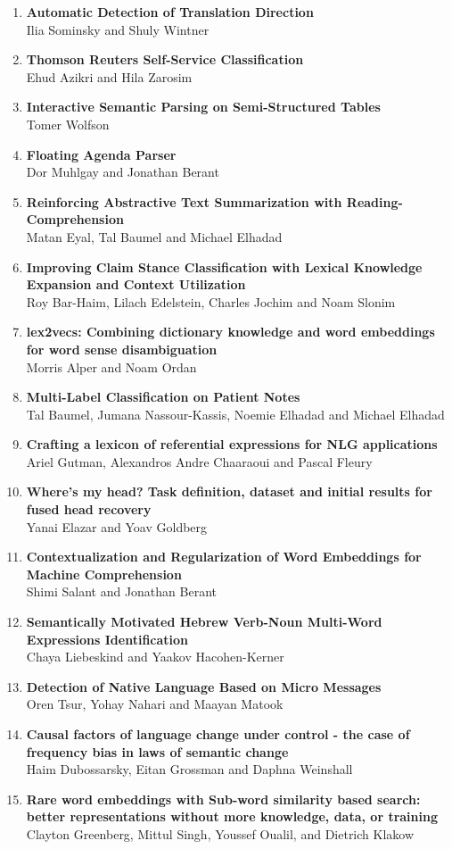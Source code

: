 \documentclass[a0,portrait]{a0poster}
\begin{document}
\begin{enumerate}
\item
  \textbf{Automatic Detection of Translation Direction}\\
  Ilia Sominsky and Shuly Wintner
\item
  \textbf{Thomson Reuters Self-Service Classification}\\
  Ehud Azikri and Hila Zarosim
\item
  \textbf{Interactive Semantic Parsing on Semi-Structured Tables}\\
  Tomer Wolfson
\item
  \textbf{Floating Agenda Parser}\\
  Dor Muhlgay and Jonathan Berant
\item
  \textbf{Reinforcing Abstractive Text Summarization with
  Reading-Comprehension}\\
  Matan Eyal, Tal Baumel and Michael Elhadad
\item
  \textbf{Improving Claim Stance Classification with Lexical Knowledge
  Expansion and Context Utilization}\\
  Roy Bar-Haim, Lilach Edelstein, Charles Jochim and Noam Slonim
\item
  \textbf{lex2vecs: Combining dictionary knowledge and word embeddings
  for word sense disambiguation}\\
  Morris Alper and Noam Ordan
\item
  \textbf{Multi-Label Classification on Patient Notes}\\
  Tal Baumel, Jumana Nassour-Kassis, Noemie Elhadad and Michael Elhadad
\item
  \textbf{Crafting a lexicon of referential expressions for NLG
  applications}\\
  Ariel Gutman, Alexandros Andre Chaaraoui and Pascal Fleury
\item
  \textbf{Where's my head? Task definition, dataset and initial results
  for fused head recovery}\\
  Yanai Elazar and Yoav Goldberg
\item
  \textbf{Contextualization and Regularization of Word Embeddings for
  Machine Comprehension}\\
  Shimi Salant and Jonathan Berant
\item
  \textbf{Semantically Motivated Hebrew Verb-Noun Multi-Word Expressions
  Identification}\\
  Chaya Liebeskind and Yaakov Hacohen-Kerner
\item
  \textbf{Detection of Native Language Based on Micro Messages}\\
  Oren Tsur, Yohay Nahari and Maayan Matook
\item
  \textbf{Causal factors of language change under control - the case of
  frequency bias in laws of semantic change}\\
  Haim Dubossarsky, Eitan Grossman and Daphna Weinshall
\item
  \textbf{Rare word embeddings with Sub-word similarity based search:
  better representations without more knowledge, data, or training}\\
  Clayton Greenberg, Mittul Singh, Youssef Oualil, and Dietrich Klakow
\end{enumerate}
\end{document}
